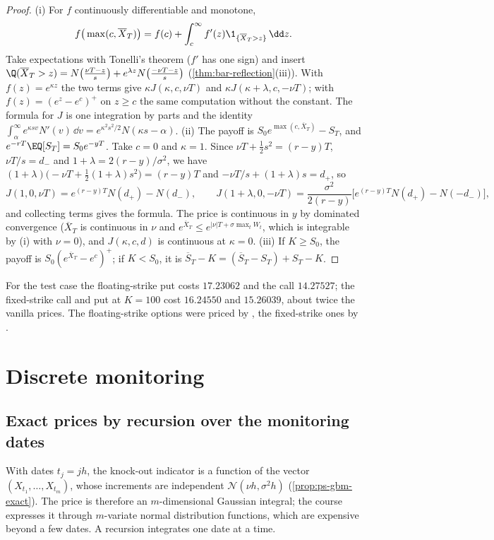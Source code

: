 \begin{proof}
(i) For $f$ continuously differentiable and monotone,
\[
  f\big(\max(c,\overline X_T)\big)=f(c)+\int_c^\infty f'(z)\1_{\{\overline X_T>z\}}\,\dd z .
\]
Take expectations with Tonelli's theorem ($f'$ has one sign) and insert
$\Q(\overline X_T>z)=N\big(\frac{\nu T-z}s\big)+e^{\lambda z}N\big(\frac{-\nu T-z}s\big)$
(\cref{thm:bar-reflection}(iii)). With
$f(z)=e^{\kappa z}$ the two terms give $\kappa J(\kappa,c,\nu T)$ and $\kappa J(\kappa+\lambda,c,-\nu T)$; with
$f(z)=(e^z-e^c)^+$ on $z\ge c$ the same computation without the constant. The formula for $J$
is one integration by parts and the identity $\int_{\alpha}^\infty e^{\kappa sv}N'(v)\,\dd v=e^{\kappa^2s^2/2}N(\kappa s-\alpha)$.
(ii) The payoff is $S_0e^{\max(c,\overline X_T)}-S_T$, and $e^{-rT}\EQ[S_T]=S_0e^{-yT}$. Take $c=0$ and
$\kappa=1$. Since $\nu T+\frac12s^2=(r-y)T$, $\nu T/s=d_-$ and $1+\lambda=2(r-y)/\sigma^2$, we have
$(1+\lambda)\big(-\nu T+\frac12(1+\lambda)s^2\big)=(r-y)T$ and $-\nu T/s+(1+\lambda)s=d_+$, so
\[
  J(1,0,\nu T)=e^{(r-y)T}N(d_+)-N(d_-),\qquad
  J(1+\lambda,0,-\nu T)=\frac{\sigma^2}{2(r-y)}\big[e^{(r-y)T}N(d_+)-N(-d_-)\big],
\]
and collecting terms gives the formula. The price is continuous in $y$ by dominated convergence
($\overline X_T$ is continuous in $\nu$ and $e^{\overline X_T}\le e^{|\nu|T+\sigma\max_tW_t}$, which is
integrable by (i) with $\nu=0$), and $J(\kappa,c,d)$ is continuous at $\kappa=0$. (iii) If $K\ge S_0$,
the payoff is $S_0(e^{\overline X_T}-e^c)^+$; if $K<S_0$, it is $\overline S_T-K=(\overline S_T-S_T)+S_T-K$.
\end{proof}

For the test case the floating-strike put costs $17.23062$ and the call $14.27527$; the
fixed-strike call and put at $K=100$ cost $16.24550$ and $15.26039$, about twice the vanilla
prices. The floating-strike options were priced by \textcite{goldman-sosin-gatto-1979}, the
fixed-strike ones by \textcite{conze-viswanathan-1991}.

\section{Discrete monitoring}\label{sec:bar-discrete}

\subsection{Exact prices by recursion over the monitoring dates}

With dates $t_j=jh$, the knock-out indicator is a function of the vector
$(X_{t_1},\dots,X_{t_m})$, whose increments are independent $\mathcal N(\nu h,\sigma^2h)$
(\cref{prop:ps-gbm-exact}). The price is therefore an $m$-dimensional Gaussian integral; the course expresses it through $m$-variate normal distribution functions, which are expensive
beyond a few dates. A recursion integrates one date at a time.

